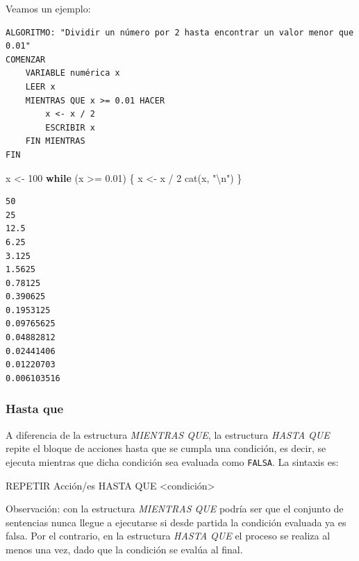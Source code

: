 \documentclass[
]{book}
\newenvironment{Shaded}{\begin{snugshade}}{\end{snugshade}}
\newcommand{\ControlFlowTok}[1]{\textcolor[rgb]{0.13,0.29,0.53}{\textbf{#1}}}
\newcommand{\DecValTok}[1]{\textcolor[rgb]{0.00,0.00,0.81}{#1}}
\newcommand{\FloatTok}[1]{\textcolor[rgb]{0.00,0.00,0.81}{#1}}
\newcommand{\FunctionTok}[1]{\textcolor[rgb]{0.00,0.00,0.00}{#1}}
\newcommand{\NormalTok}[1]{#1}
\newcommand{\OtherTok}[1]{\textcolor[rgb]{0.56,0.35,0.01}{#1}}
\newcommand{\SpecialCharTok}[1]{\textcolor[rgb]{0.00,0.00,0.00}{#1}}
\newcommand{\StringTok}[1]{\textcolor[rgb]{0.31,0.60,0.02}{#1}}
\begin{document}
Veamos un ejemplo:

\begin{verbatim}
ALGORITMO: "Dividir un número por 2 hasta encontrar un valor menor que 0.01"
COMENZAR
    VARIABLE numérica x
    LEER x
    MIENTRAS QUE x >= 0.01 HACER
        x <- x / 2
        ESCRIBIR x
    FIN MIENTRAS
FIN
\end{verbatim}

\begin{Shaded}
\begin{Highlighting}[]
\NormalTok{x }\OtherTok{\textless{}{-}} \DecValTok{100}
\ControlFlowTok{while}\NormalTok{ (x }\SpecialCharTok{\textgreater{}=} \FloatTok{0.01}\NormalTok{) \{}
\NormalTok{    x }\OtherTok{\textless{}{-}}\NormalTok{ x }\SpecialCharTok{/} \DecValTok{2}
    \FunctionTok{cat}\NormalTok{(x, }\StringTok{"}\SpecialCharTok{\textbackslash{}n}\StringTok{"}\NormalTok{)}
\NormalTok{\}}
\end{Highlighting}
\end{Shaded}

\begin{verbatim}
50 
25 
12.5 
6.25 
3.125 
1.5625 
0.78125 
0.390625 
0.1953125 
0.09765625 
0.04882812 
0.02441406 
0.01220703 
0.006103516 
\end{verbatim}

\hypertarget{hasta-que}{%
\subsubsection{Hasta que}\label{hasta-que}}

A diferencia de la estructura \emph{MIENTRAS QUE}, la estructura \emph{HASTA QUE} repite el bloque de acciones hasta que se cumpla una condición, es decir, se ejecuta mientras que dicha condición sea evaluada como \texttt{FALSA}. La sintaxis es:

\begin{Shaded}
\begin{Highlighting}[]
\NormalTok{REPETIR}
\NormalTok{   Acción/es}
\NormalTok{HASTA QUE \textless{}condición\textgreater{}}
\end{Highlighting}
\end{Shaded}

Observación: con la estructura \emph{MIENTRAS QUE} podría ser que el conjunto de sentencias nunca llegue a ejecutarse si desde partida la condición evaluada ya es falsa. Por el contrario, en la estructura \emph{HASTA QUE} el proceso se realiza al menos una vez, dado que la condición se evalúa al final.
\end{document}

